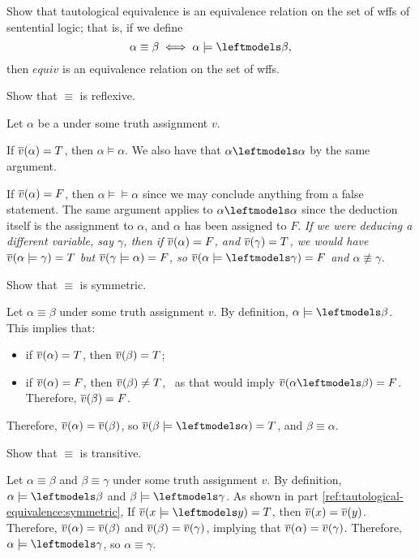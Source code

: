 \begin{problem}
  Show that tautological equivalence is an equivalence relation
  on the set of wffs of sentential logic;
  that is, if we define
  \[ \alpha \equiv \beta \iff \alpha \models \backmodels \beta, \]
  then $equiv$ is an equivalence relation on the set of wffs.
\end{problem}
\begin{Answer}
  \begin{enumroman}
    \item Show that $\equiv$ is reflexive.
    
    \step
    Let $\alpha$ be a under some truth assignment $v$.

    \step
    If $\overline{v}(\alpha) = T$, then $\alpha \models \alpha$.
    We also have that $\alpha \backmodels \alpha$ by the same argument.

    \step
    If $\overline{v}(\alpha) = F$, then $\alpha \models \models \alpha$
    since we may conclude anything from a false statement.
    The same argument applies to $\alpha \backmodels \alpha$
    since the deduction itself is the assignment to $\alpha$,
    and $\alpha$ has been assigned to $F$.
    \emph{
      If we were deducing a different variable, say $\gamma$,
      then if $\overline{v}(\alpha) = F$, and $\overline{v}(\gamma) = T$,
      we would have $\overline{v}(\alpha \models \gamma) = T$
      but $\overline{v}(\gamma \models \alpha) = F$,
      so $\vbar(\alpha \models \backmodels \gamma) = F$
      and $\alpha \nequiv \gamma$.
    }


    \item
      Show that $\equiv$ is symmetric.

      \step
      Let $\alpha \equiv \beta$ under some truth assignment $v$.
      By definition, $\alpha \models \backmodels \beta$.
      This implies that:
      \begin{itemize}
        \item if $\overline{v}(\alpha) = T$, then $\overline{v}(\beta) = T$;
        \item if $\overline{v}(\alpha) = F$, then $\overline{v}(\beta) \ne T$,~\label{ref:tautological-equivalence:symmetric}
          as that would imply $\vbar(\alpha \backmodels \beta) = F$.
          Therefore, $\overline{v}(\beta) = F$.
      \end{itemize}
      Therefore, $\overline{v}(\alpha) = \overline{v}(\beta)$, so $\vbar(\beta \models \backmodels \alpha) = T$, and $\beta \equiv \alpha$.
    \item
      Show that $\equiv$ is transitive.

      \step
      Let $\alpha \equiv \beta$ and $\beta \equiv \gamma$ under some truth assignment $v$.
      By definition, $\alpha \models \backmodels \beta$ and $\beta \models \backmodels \gamma$.
      As shown in part \ref{ref:tautological-equivalence:symmetric},
      If $\vbar(x \models \backmodels y) = T$, then $\overline{v}(x) = \overline{v}(y)$.
      Therefore, $\overline{v}(\alpha) = \overline{v}(\beta)$ and $\overline{v}(\beta) = \overline{v}(\gamma)$,
      implying that $\overline{v}(\alpha) = \overline{v}(\gamma)$.
      Therefore, $\alpha \models \backmodels \gamma$, so $\alpha \equiv \gamma$.
  \end{enumroman}
\end{Answer}
